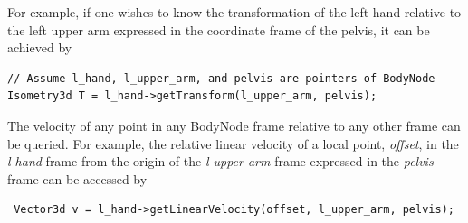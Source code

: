 For  example, if one wishes to know the transformation of the left
hand relative to the left upper arm expressed in the coordinate frame of the
pelvis, it can be achieved by 

\begin{lstlisting}
// Assume l_hand, l_upper_arm, and pelvis are pointers of BodyNode
Isometry3d T = l_hand->getTransform(l_upper_arm, pelvis);
\end{lstlisting}

The velocity of any point in any BodyNode frame relative to any other
frame can be queried. For example, the relative linear velocity of a
local point, \emph{offset}, in the \emph{l-hand} frame from the origin of the \emph{l-upper-arm} frame expressed in the \emph{pelvis} frame can be accessed by

\begin{lstlisting}
 Vector3d v = l_hand->getLinearVelocity(offset, l_upper_arm, pelvis);
\end{lstlisting}










